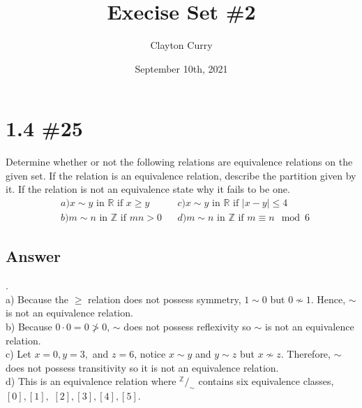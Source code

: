 \documentclass[
	12pt, %
]{fphw}
\title{Execise Set \#2} %
\author{Clayton Curry} %
\date{September 10th, 2021} %
\institute{University of Oklahoma \\ Department of Mathematics} %
\newcommand\R{\mathbb{R}}
\newcommand\Z{\mathbb{Z}}
\newcommand*\quot[2]{{^{\textstyle #1}\big/ _{\textstyle #2}}}
\begin{document}
\maketitle %


\section*{1.4 \#25}

\begin{problem}
Determine whether or not the following relations are equivalence
relations on the given set. If the relation is an equivalence relation,
describe the partition given by it. If the relation is not an equivalence state why it fails to be one.
\begin{align*}
&a) x \sim y \text{ in } \R{} \text{ if } x \ge y &&c) x \sim y \text{ in } \R{} \text{ if } |x - y| \le 4\\
&b) m \sim n \text{ in } \Z{} \text{ if } mn > 0 &&d) m \sim n \text{ in }  \Z{} \text{ if } m \equiv n \mod 6
\end{align*}	

\end{problem}


\subsection*{Answer} .\\
a) Because the $\ge$ relation does not possess symmetry, $1 \sim 0$ but $0 \not \sim 1$. Hence, $\sim$ is not an equivalence relation.\\
b) Because $0 \cdot 0 = 0 \not > 0$, $\sim$ does not possess reflexivity so $\sim$ is not an equivalence relation.\\
c) Let $x = 0, y = 3,$ and $z = 6$, notice $x \sim y$ and $y \sim z$ but $x \not \sim z$.  Therefore, $\sim$ does not possess transitivity so it is not an equivalence relation.\\
d) This is an equivalence relation where $\quot{\Z{}}{\sim}$ contains six equivalence classes, $[0], [1], $ $[2], [3], [4], [5]$.
\end{document}
